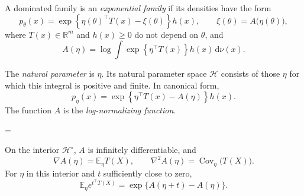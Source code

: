 \begin{definition}
A dominated family is an \emph{exponential family} if its densities have
the form
\begin{equation}
p_\theta(x)
=
\exp\left\{
\eta(\theta)^\top T(x)-\xi(\theta)
\right\}h(x),
\qquad
\xi(\theta)=A\bigl(\eta(\theta)\bigr),
\tag{5}
\end{equation}
where $T(x)\in\mathbb{R}^m$ and $h(x)\geq0$ do not depend on $\theta$,
and
\[
A(\eta)
=
\log\int
\exp\left\{\eta^\top T(x)\right\}
h(x)\,\mathrm{d}\nu(x).
\]

The \emph{natural parameter} is $\eta$. Its natural parameter space
$\mathcal{H}$ consists of those $\eta$ for which this integral is
positive and finite. In canonical form,
\[
p_\eta(x)
=
\exp\left\{
\eta^\top T(x)-A(\eta)
\right\}h(x).
\]
The function $A$ is the \emph{log-normalizing function}.
\end{definition}
=
\begin{proposition}
On the interior $\mathcal{H}^{\circ}$, $A$ is infinitely differentiable, and
\begin{equation}
\nabla A(\eta)=\mathbb{E}_{\eta}T(X),
\qquad
\nabla^2 A(\eta)=\operatorname{Cov}_{\eta}\bigl(T(X)\bigr).
\tag{6}
\end{equation}
For $\eta$ in this interior and $t$ sufficiently close to zero,
\[
\mathbb{E}_{\eta}e^{t^\top T(X)}
=
\exp\bigl\{A(\eta+t)-A(\eta)\bigr\}.
\]
\end{proposition}

